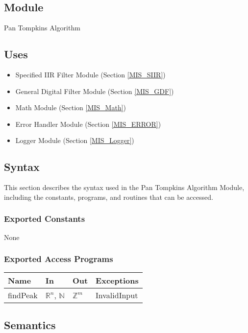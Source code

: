 \documentclass[12pt, titlepage]{article}
\begin{document}
\subsection{Module}

Pan Tompkins Algorithm

\subsection{Uses}

\begin{itemize}
\item Specified IIR Filter Module (Section \ref{MIS_SIIR})
\item General Digital Filter Module (Section \ref{MIS_GDF})
\item Math Module (Section \ref{MIS_Math})
\item Error Handler Module (Section \ref{MIS_ERROR})
\item Logger Module (Section \ref{MIS_Logger})
\end{itemize}

\subsection{Syntax}

This section describes the syntax used in the Pan Tompkins Algorithm Module,
including the constants, programs, and routines that can be accessed.

\subsubsection{Exported Constants}

None

\subsubsection{Exported Access Programs}

\begin{center}
\begin{tabular}{p{2cm} p{4cm} p{4cm} p{2cm}}
\hline
\textbf{Name} & \textbf{In} & \textbf{Out} & \textbf{Exceptions} \\
\hline
findPeak & $\mathbb{R}^n$, $\mathbb{N}$ & $\mathbb{Z}^m$ & InvalidInput \\
\hline
\end{tabular}
\end{center}

\subsection{Semantics}
\end{document}
